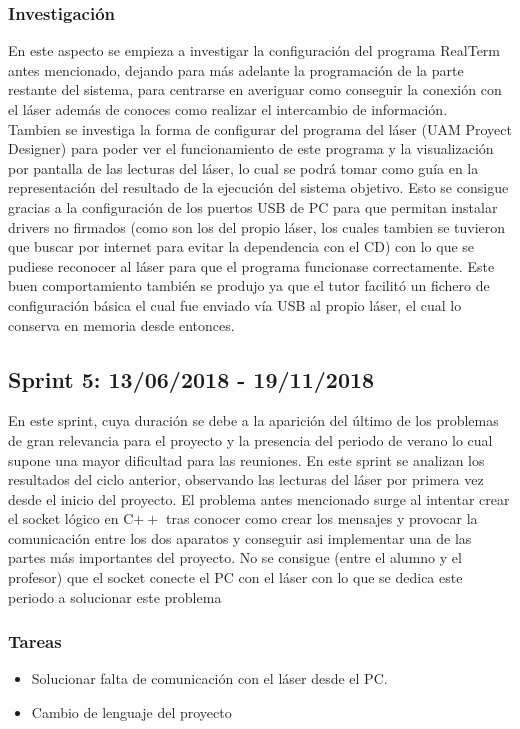 \subsubsection{Investigación}
En este aspecto se empieza a investigar la configuración del programa RealTerm antes mencionado, dejando para más adelante la programación de la parte restante del sistema, para centrarse en averiguar como conseguir la conexión con el láser además de conoces como realizar el intercambio de información.\\
Tambien se investiga la forma de configurar del programa del láser (UAM Proyect Designer) para poder ver el funcionamiento de este programa y la visualización por pantalla de las lecturas del láser, lo cual se podrá tomar como guía en la representación del resultado de la ejecución del sistema objetivo. Esto se consigue gracias a la configuración de los puertos USB de PC para que permitan instalar drivers no firmados (como son los del propio láser, los cuales tambien se tuvieron que buscar por internet para evitar la dependencia con el CD) con lo que se pudiese reconocer al láser para que el programa funcionase correctamente. Este buen comportamiento también se produjo ya que el tutor facilitó un fichero de configuración básica el cual fue enviado vía USB al propio láser, el cual lo conserva en memoria desde entonces.
\subsection{Sprint 5: 13/06/2018 - 19/11/2018}
En este sprint, cuya duración se debe a la aparición del último de los problemas de gran relevancia para el proyecto y la presencia del periodo de verano lo cual supone una mayor dificultad para las reuniones. En este sprint se analizan los resultados del ciclo anterior, observando las lecturas del láser por primera vez desde el inicio del proyecto. El problema antes mencionado surge al intentar crear el socket lógico en C$++$ tras conocer como crear los mensajes y provocar la comunicación entre los dos aparatos y conseguir asi implementar una de las partes más importantes del proyecto. No se consigue (entre el alumno y el profesor) que el socket conecte el PC con el láser con lo que se dedica este periodo a solucionar este problema
\subsubsection{Tareas}
\begin{itemize}
	\item Solucionar falta de comunicación con el láser desde el PC.
	\item Cambio de lenguaje del proyecto
\end{itemize}
